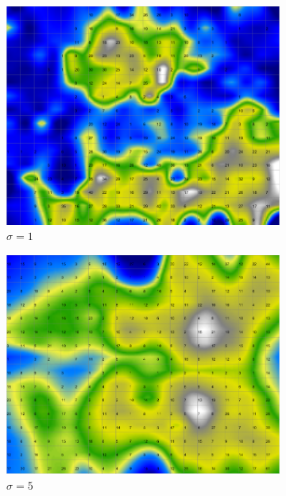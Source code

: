 \documentclass{acm_proc_article-sp}
\begin{document}
\begin{figure}
\centering
    \centering
    \begin{subfigure}[b]{0.30\linewidth}
        \includegraphics[width=\linewidth]{img/wine-newmid-smoothed-data-histogram-sigma-1}
        \caption{$\sigma=1$}
    \end{subfigure}
    \begin{subfigure}[b]{0.30\linewidth}
        \includegraphics[width=\linewidth]{img/wine-newmid-smoothed-data-histogram-sigma-5}
        \caption{$\sigma=5$}
    \end{subfigure}
    \begin{subfigure}[b]{0.30\linewidth}

\end{subfigure}
\end{figure}
\end{document}
